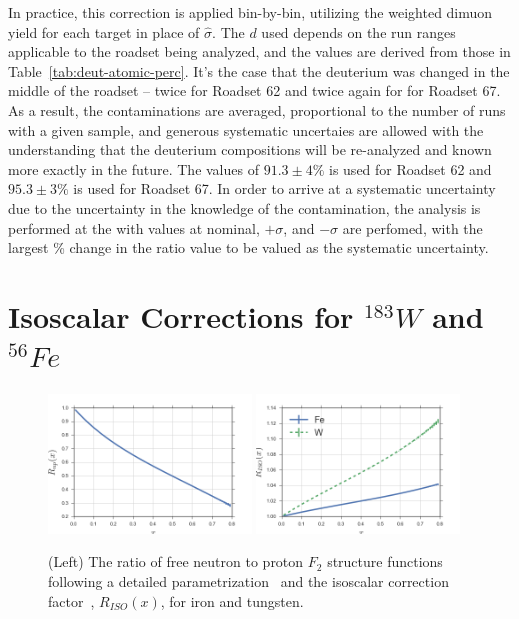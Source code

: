 In practice, this correction is applied bin-by-bin, utilizing the weighted dimuon yield for each target in place of $\hat{\sigma}$. The $d$ used depends on the run ranges applicable to the roadset being analyzed, and the values are derived from those in Table~\ref{tab:deut-atomic-perc}. It's the case that the deuterium was changed in the middle of the roadset -- twice for Roadset 62 and twice again for for Roadset 67. As a result, the contaminations are averaged, proportional to the number of runs with a given sample, and generous systematic uncertaies are allowed with the understanding that the deuterium compositions will be re-analyzed and known more exactly in the future. The values of $91.3\pm4\%$ is used for Roadset 62 and $95.3\pm3\%$ is used for Roadset 67. In order to arrive at a systematic uncertainty due to the uncertainty in the knowledge of the contamination, the analysis is performed at the with values at nominal, $+\sigma$, and $-\sigma$ are perfomed, with the largest \% change in the ratio value to be valued as the systematic uncertainty.

\section{\texorpdfstring{Isoscalar Corrections for $^{183}W$ and $^{56}Fe$}{Isoscalar Corrections for W-183 and Fe-56 }}

\begin{figure}
	\centering
	\includegraphics[width=0.48\textwidth]{figures/analysis/rnp.png}
	\includegraphics[width=0.48\textwidth]{figures/analysis/riso.png}
	\caption{(Left) The ratio of free neutron to proton $F_2$ structure functions following a detailed parametrization~\cite{Arrington:2008zh} and the isoscalar correction factor~\cite{Hen:2013oha}, $R_{ISO}(x)$, for iron and tungsten.}
	\label{fig:rnp-riso}
\end{figure}

